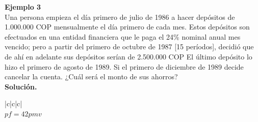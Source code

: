 \textbf{Ejemplo 3}\\

Una persona empieza el día primero de julio de 1986 a hacer depósitos de 1.000.000 COP
mensualmente el día primero de cada mes. Estos depósitos son efectuados en una entidad
financiera que le paga el 24\% nominal anual mes vencido; pero a partir del primero de
octubre de 1987 [15 períodos], decidió que de ahí en adelante sus depósitos serían de 2.500.000 COP
El último depósito lo hizo el primero de agosto de 1989. Si el primero de diciembre de 1989
decide cancelar la cuenta. ¿Cuál será el monto de sus ahorros?
\\

\textbf{Solución.}\\
\begin{center}
	\renewcommand{\arraystretch}{1.5}%
\begin{longtable}[H]{|c|c|c|}
\hline
   \\ \hline
{} {$pf = 42 pmv$} \\ \hline
  
    \\ \hline


\end{longtable}
\end{center}
